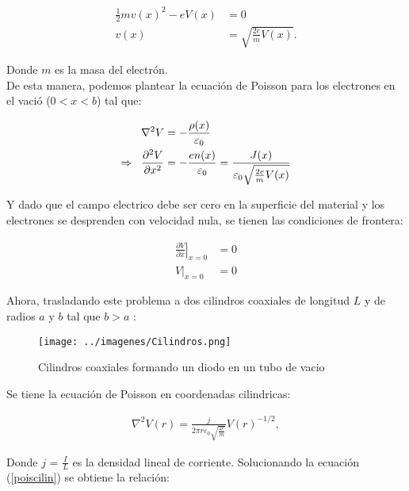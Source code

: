 \documentclass[%
 reprint,
 amsmath,amssymb,
 aps,
]{revtex4-2}
\begin{document}
    \begin{align*}
        \frac{1}{2}mv(x)^{2} - eV(x) &= 0\\
        v(x) &= \sqrt{\frac{2e}{m}V(x)}.
    \end{align*}

\vspace{0.2 cm}
Donde $m$ es la masa del electrón.
\\

De esta manera, podemos plantear la ecuación de Poisson para los electrones en el vació ($0<x<b$) tal que:

\begin{align*}
    \nabla^{2}V &= -\frac{\rho (x)}{\varepsilon_{0}} \\ \Rightarrow \hspace{0.2 cm} \frac{\partial^{2}V}{\partial x^{2}} &= -\frac{en(x)}{\varepsilon_{0}} = \frac{J(x)}{\varepsilon_{0}\sqrt{\frac{2e}{m}V(x)}}
\end{align*}

\vspace{0.2 cm}
Y dado que el campo electrico debe ser cero en la superficie del material y los electrones se desprenden con velocidad nula, se tienen las condiciones de frontera:

\begin{align*}
    \left. \frac{\partial V}{\partial x}\right|_{x=0}&=0\\
        \left. V\right|_{x=0}&=0
\end{align*}

\vspace{0.2 cm}
Ahora, trasladando este problema a dos cilindros coaxiales de longitud $L$ y de radios $a$ y $b$ tal que $b>a$ :

\begin{figure}[H]
    \centering
    \texttt{[image: ../imagenes/Cilindros.png]}
    \caption{Cilindros coaxiales formando un diodo en un tubo de vacio}
    \label{fig:2}
\end{figure}

\vspace{0.2 cm}
Se tiene la ecuación de Poisson en coordenadas cilindricas:

\begin{align}
    \label{poiscilin}
    \nabla^{2}V(r) = \frac{j}{2\pi r \varepsilon_{0}\sqrt{\frac{2e}{m}}} V(r)^{-1/2},
\end{align}

\vspace{0.2 cm}
Donde $j$ = $\frac{I}{L}$ es la densidad lineal de corriente. Solucionando la ecuación (\ref{poiscilin}) se obtiene la relación:
\end{document}
